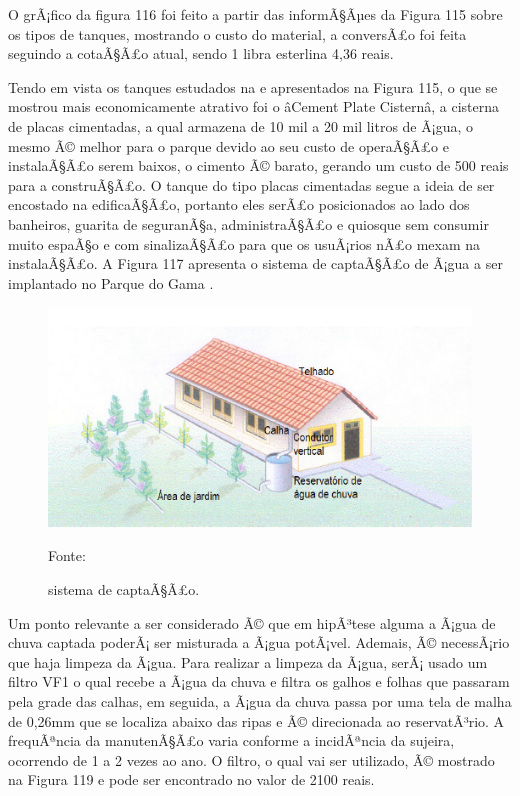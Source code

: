 O grÃ¡fico da figura 116 foi feito a partir das informÃ§Ãµes da Figura 115 sobre os tipos de tanques, mostrando o custo do material, a conversÃ£o foi feita seguindo a cotaÃ§Ã£o atual, sendo 1 libra esterlina 4,36 reais.

Tendo em vista os tanques estudados na e apresentados na Figura 115, o que se mostrou mais economicamente atrativo foi o âCement Plate Cisternâ, a cisterna de placas cimentadas, a qual armazena de 10 mil a 20 mil litros de Ã¡gua, o mesmo Ã© melhor para o parque devido ao seu custo de operaÃ§Ã£o e instalaÃ§Ã£o serem baixos, o cimento Ã© barato, gerando um custo de 500 reais para a construÃ§Ã£o. O tanque do tipo placas cimentadas segue a ideia de ser encostado na edificaÃ§Ã£o, portanto eles serÃ£o posicionados ao lado dos banheiros, guarita de seguranÃ§a, administraÃ§Ã£o e quiosque sem consumir muito espaÃ§o e com sinalizaÃ§Ã£o para que os usuÃ¡rios nÃ£o mexam na instalaÃ§Ã£o. A Figura 117 apresenta o sistema de captaÃ§Ã£o de Ã¡gua a ser implantado no Parque do Gama \cite{gnadlinger1999technical}. 

\begin{figure}[H]
	 \centering
	\label{sistema de captaÃ§Ã£o}
	 \includegraphics[scale=0.6]{captacao/9.png}
	 \caption{sistema de captaÃ§Ã£o.}
	  \small{Fonte: \cite{WATERFALL}}
\end{figure}

Um ponto relevante a ser considerado Ã© que em hipÃ³tese alguma a Ã¡gua de chuva captada poderÃ¡ ser misturada a Ã¡gua potÃ¡vel. Ademais, Ã© necessÃ¡rio que haja limpeza da Ã¡gua. Para realizar a limpeza da Ã¡gua, serÃ¡ usado um filtro VF1 o qual recebe a Ã¡gua da chuva e filtra os galhos e folhas que passaram pela grade das calhas, em seguida, a Ã¡gua da chuva passa por uma tela de malha de 0,26mm que se localiza abaixo das ripas e Ã© direcionada ao reservatÃ³rio. A frequÃªncia da manutenÃ§Ã£o varia conforme a incidÃªncia da sujeira, ocorrendo de 1 a 2 vezes ao ano. O filtro, o qual vai ser utilizado, Ã© mostrado na Figura 119 e pode ser encontrado no valor de 2100 reais. 


